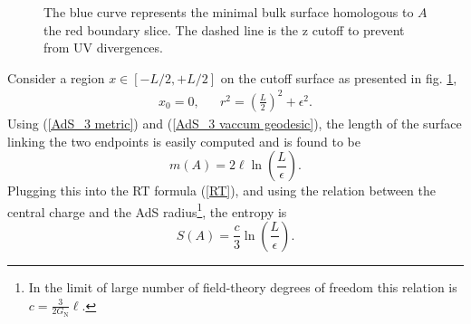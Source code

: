 \begin{figure}
    \centering
    \caption{The blue curve represents the minimal bulk surface homologous to $A$ the red boundary slice. The dashed line is the z cutoff to prevent from UV divergences.}
    \label{Vacuum AdS}
\end{figure}

Consider a region $x\in\left[-L/2,+L/2\right]$ on the cutoff surface as presented in fig. \ref{Vacuum AdS},
\begin{align}
    x_0 = 0,        &&      r^2 = \left(\frac{L}{2}\right)^2+\epsilon^2.
\end{align}
Using (\ref{AdS_3 metric}) and (\ref{AdS_3 vaccum geodesic}), the length of the surface linking the two endpoints is easily computed and is found to be
\begin{equation}\label{first RT}
    m\left(A\right) = 2\ell\ln\left(\frac{L}{\epsilon}\right).
\end{equation}
Plugging this into the RT formula (\ref{RT}), and using the relation between the central charge and the AdS radius\footnote{In the limit of large number of field-theory degrees of freedom this relation is $c=\frac{3}{2G_\text{N}}\ell$.}, the entropy is
\begin{equation}
    S\left(A\right)= \frac{c}{3}\ln\left(\frac{L}{\epsilon}\right).
\end{equation}

